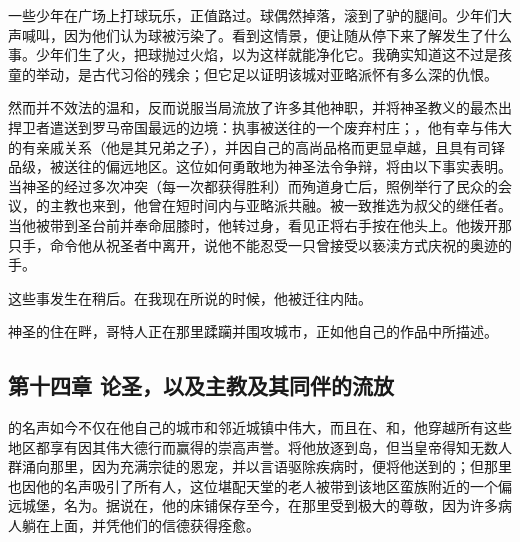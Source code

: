 一些少年在广场上打球玩乐，正值路过。球偶然掉落，滚到了驴的腿间。少年们大声喊叫，因为他们认为球被污染了。看到这情景，便让随从停下来了解发生了什么事。少年们生了火，把球抛过火焰，以为这样就能净化它。我确实知道这不过是孩童的举动，是古代习俗的残余；但它足以证明该城对亚略派怀有多么深的仇恨。\par

然而并不效法的温和，反而说服当局流放了许多其他神职，并将神圣教义的最杰出捍卫者遣送到罗马帝国最远的边境：执事被送往的一个废弃村庄；，他有幸与伟大的有亲戚关系（他是其兄弟之子），并因自己的高尚品格而更显卓越，且具有司铎品级，被送往的偏远地区。这位如何勇敢地为神圣法令争辩，将由以下事实表明。当神圣的经过多次冲突（每一次都获得胜利）而殉道身亡后，照例举行了民众的会议，的主教也来到，他曾在短时间内与亚略派共融。被一致推选为叔父的继任者。当他被带到圣台前并奉命屈膝时，他转过身，看见正将右手按在他头上。他拨开那只手，命令他从祝圣者中离开，说他不能忍受一只曾接受以亵渎方式庆祝的奥迹的手。\par

这些事发生在稍后。在我现在所说的时候，他被迁往内陆。\par

神圣的住在畔，哥特人正在那里蹂躏并围攻城市，正如他自己的作品中所描述。\par


\subsection{第十四章 论圣，以及主教及其同伴的流放}

的名声如今不仅在他自己的城市和邻近城镇中伟大，而且在、和，他穿越所有这些地区都享有因其伟大德行而赢得的崇高声誉。将他放逐到岛，但当皇帝得知无数人群涌向那里，因为充满宗徒的恩宠，并以言语驱除疾病时，便将他送到的；但那里也因他的名声吸引了所有人，这位堪配天堂的老人被带到该地区蛮族附近的一个偏远城堡，名为。据说在，他的床铺保存至今，在那里受到极大的尊敬，因为许多病人躺在上面，并凭他们的信德获得痊愈。\par

